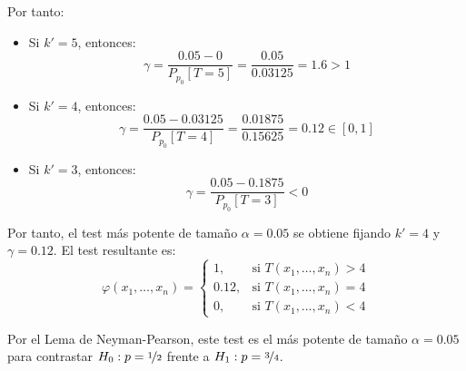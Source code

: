 \begin{ejemplo}
    Por tanto:
    \begin{itemize}
        \item Si $k' = 5$, entonces:
        \begin{equation*}
            \gamma = \frac{0.05 - 0}{P_{p_0}[T = 5]} = \frac{0.05}{0.03125} = 1.6 > 1
        \end{equation*}
        \item Si $k' = 4$, entonces:
        \begin{equation*}
            \gamma = \frac{0.05 - 0.03125}{P_{p_0}[T = 4]} = \frac{0.01875}{0.15625} = 0.12 \in [0,1]
        \end{equation*}
        \item Si $k' = 3$, entonces:
        \begin{equation*}
            \gamma = \frac{0.05 - 0.1875}{P_{p_0}[T = 3]} < 0
        \end{equation*}
    \end{itemize}

    Por tanto, el test más potente de tamaño $\alpha = 0.05$ se obtiene fijando $k' = 4$ y $\gamma = 0.12$. El test resultante es:
    \begin{equation*}
        \varphi(x_1, \dots, x_n) =
        \begin{cases}
            1, & \text{si } T(x_1, \dots, x_n) > 4 \\
            0.12, & \text{si } T(x_1, \dots, x_n) = 4 \\
            0, & \text{si } T(x_1, \dots, x_n) < 4
        \end{cases}
    \end{equation*}

    Por el Lema de Neyman-Pearson, este test es el más potente de tamaño $\alpha = 0.05$ para contrastar $H_0: p = \nicefrac{1}{2}$ frente a $H_1: p = \nicefrac{3}{4}$.
\end{ejemplo}

